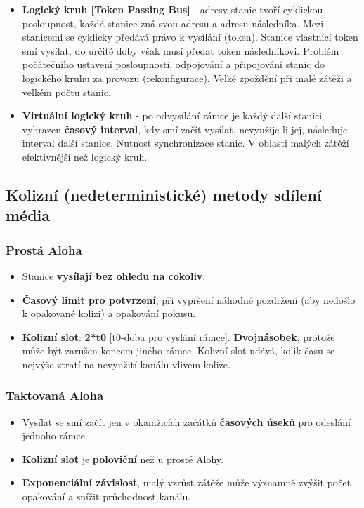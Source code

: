 \begin{itemize}
\begin{itemize}
					\item \textbf{Logický kruh [Token Passing Bus]} - adresy stanic tvoří cyklickou posloupnost, každá stanice zná svou adresu a adresu následníka. Mezi stanicemi se cyklicky předává právo k vysílání (token). Stanice vlastnící token smí vysílat, do určité doby však musí předat token následníkovi. Problém počátečního ustavení posloupnosti, odpojování a připojování stanic do logického kruhu za provozu (rekonfigurace). Velké zpoždění při malé zátěži a velkém počtu stanic.
					\item \textbf{Virtuální logický kruh} - po odvysílání rámce je každý další stanici vyhrazen \textbf{časový interval}, kdy smí začít vysílat, nevyužije-li jej, následuje interval další stanice. Nutnost synchronizace stanic. V oblasti malých zátěží efektivnější než logický kruh.
	\end{itemize}
\end{itemize}

\subsection{Kolizní (nedeterministické) metody sdílení média}
\subsubsection*{Prostá Aloha}
\begin{itemize}
\item Stanice \textbf{vysílají bez ohledu na cokoliv}.
\item \textbf{Časový limit pro potvrzení}, při vypršení náhodné pozdržení (aby nedošlo k opakované kolizi) a opakování pokusu.
\item \textbf{Kolizní slot}: \textbf{2*t0} [t0-doba pro vyslání rámce]. \textbf{Dvojnásobek}, protože může být zarušen koncem jiného rámce. Kolizní slot udává, kolik času se nejvýše ztratí na nevyužití kanálu vlivem kolize. 
\end{itemize}

\subsubsection*{Taktovaná Aloha}
\begin{itemize}
\item Vysílat se smí začít jen v okamžicích začátků \textbf{časových úseků} pro odeslání jednoho rámce.
\item \textbf{Kolizní slot} je \textbf{poloviční} než u prosté Alohy.
\item \textbf{Exponenciální závislost}, malý vzrůst zátěže může významně zvýšit počet opakování a snížit průchodnost kanálu.
\end{itemize}

